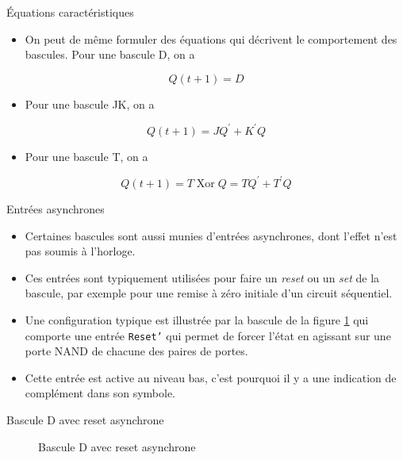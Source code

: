 \documentclass[presentation]{beamer}
\begin{document}
\begin{frame}[label={sec:org45329b7}]{Équations caractéristiques}
\begin{itemize}
\item On peut de même formuler des équations qui décrivent le comportement des bascules. Pour une bascule D, on a
\end{itemize}

$$ Q(t+1) = D $$

\begin{itemize}
\item Pour une bascule JK, on a
\end{itemize}

$$ Q(t+1) =J Q^\prime + K^\prime Q $$

\begin{itemize}
\item Pour une bascule T, on a
\end{itemize}

$$ Q(t+1) = T \operatorname{Xor} Q = T Q^\prime + T^\prime Q $$
\end{frame}

\begin{frame}[label={sec:orgeb71e72},fragile]{Entrées asynchrones}
 \begin{itemize}
\item Certaines bascules sont aussi munies d'entrées asynchrones, dont l'effet n'est pas soumis à l'horloge.

\item Ces entrées sont typiquement utilisées pour faire un \emph{reset} ou un \emph{set} de la bascule, par exemple pour une remise à zéro initiale d'un circuit séquentiel.

\item Une configuration typique est illustrée par la bascule de la figure \ref{fig:org3e35a00} qui comporte une entrée \texttt{Reset'} qui permet de forcer l'état en agissant sur une porte NAND de chacune des paires de portes.

\item Cette entrée est active au niveau bas, c'est pourquoi il y a une indication de complément dans son symbole.
\end{itemize}
\end{frame}

\begin{frame}[label={sec:orgdc2a31c}]{Bascule D avec reset asynchrone}
\begin{figure}[htbp]
\centering

\caption{\label{fig:org3e35a00}Bascule D avec reset asynchrone}
\end{figure}
\end{frame}
\end{document}
